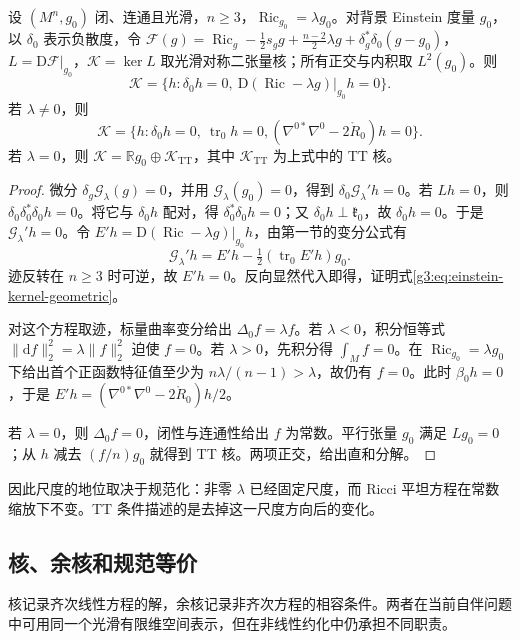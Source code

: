 \begin{proposition}\label{g3:prop:einstein-kernel-tt}
	设 \((M^n,g_0)\) 闭、连通且光滑，\(n\ge3\)，\(\operatorname{Ric}_{g_0}=\lambda g_0\)。对背景 Einstein 度量 \(g_0\)，以 \(\delta_0\) 表示负散度，令 \(\mathcal F(g)=\operatorname{Ric}_g-\tfrac12s_gg+\tfrac{n-2}2\lambda g+\delta_g^*\delta_0(g-g_0)\)，\(L=\mathrm D\mathcal F|_{g_0}\)，\(\mathcal K=\ker L\) 取光滑对称二张量核；所有正交与内积取 \(L^2(g_0)\)。则
	\begin{equation}\label{g3:eq:einstein-kernel-geometric}
		\mathcal K=\{h:\delta_0h=0,\ \mathrm D(\operatorname{Ric}-\lambda g)|_{g_0}h=0\}.
	\end{equation}
	若 \(\lambda\ne0\)，则
	\[
		\mathcal K=\{h:\delta_0h=0,\ \operatorname{tr}_0h=0,
		(\nabla^{0*}\nabla^0-2\mathring R_0)h=0\}.
	\]
	若 \(\lambda=0\)，则 \(\mathcal K=\mathbb Rg_0\oplus\mathcal K_{\mathrm{TT}}\)，其中 \(\mathcal K_{\mathrm{TT}}\) 为上式中的 TT 核。
\end{proposition}
\begin{proof}
	微分 \(\delta_g\mathcal G_\lambda(g)=0\)，并用 \(\mathcal G_\lambda(g_0)=0\)，得到 \(\delta_0\mathcal G_\lambda'h=0\)。若 \(Lh=0\)，则 \(\delta_0\delta_0^*\delta_0h=0\)。将它与 \(\delta_0h\) 配对，得 \(\delta_0^*\delta_0h=0\)；又 \(\delta_0h\perp\mathfrak k_0\)，故 \(\delta_0h=0\)。于是 \(\mathcal G_\lambda'h=0\)。令 \(E'h=\mathrm D(\operatorname{Ric}-\lambda g)|_{g_0}h\)，由第一节的变分公式有
	\[
		\mathcal G_\lambda'h=E'h-\tfrac12(\operatorname{tr}_0E'h)g_0.
	\]
	迹反转在 \(n\ge3\) 时可逆，故 \(E'h=0\)。反向显然代入即得，证明式\eqref{g3:eq:einstein-kernel-geometric}。

	对这个方程取迹，标量曲率变分给出 \(\Delta_0f=\lambda f\)。若 \(\lambda<0\)，积分恒等式 \(\|\mathrm df\|_2^2=\lambda\|f\|_2^2\) 迫使 \(f=0\)。若 \(\lambda>0\)，先积分得 \(\int_M f=0\)。在 \(\operatorname{Ric}_{g_0}=\lambda g_0\) 下给出首个正函数特征值至少为 \(n\lambda/(n-1)>\lambda\)，故仍有 \(f=0\)。此时 \(\beta_0h=0\)，于是 \(E'h=(\nabla^{0*}\nabla^0-2\mathring R_0)h/2\)。

	若 \(\lambda=0\)，则 \(\Delta_0f=0\)，闭性与连通性给出 \(f\) 为常数。平行张量 \(g_0\) 满足 \(L g_0=0\)；从 \(h\) 减去 \((f/n)g_0\) 就得到 TT 核。两项正交，给出直和分解。
\end{proof}

因此尺度的地位取决于规范化：非零 \(\lambda\) 已经固定尺度，而 Ricci 平坦方程在常数缩放下不变。TT 条件描述的是去掉这一尺度方向后的变化。

\subsection{核、余核和规范等价}
\label{g3:subsec:2503:02}
核记录齐次线性方程的解，余核记录非齐次方程的相容条件。两者在当前自伴问题中可用同一个光滑有限维空间表示，但在非线性约化中仍承担不同职责。

